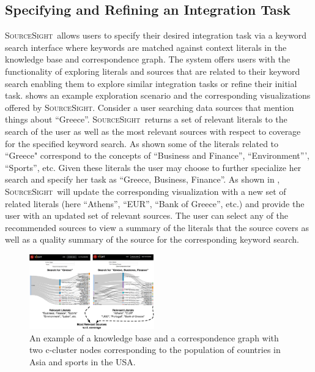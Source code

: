 \documentclass{vldb}
\newcommand\system{\textsc{SourceSight}}
\begin{document}
\subsection{Specifying and Refining an Integration Task}
\label{sec:integtask}
\system~allows users to specify their desired integration task via a keyword search interface where keywords are matched against context literals in the knowledge base and correspondence graph. The system offers users with the functionality of exploring literals and sources that are related to their keyword search enabling them to explore similar integration tasks or refine their initial task.  shows an example exploration scenario and the corresponding visualizations offered by \system. Consider a user searching data sources that mention things about ``Greece''.  \system~returns a set of relevant literals to the search of the user as well as the most relevant sources with respect to coverage for the specified keyword search. As shown some of the literals related to ``Greece" correspond to the concepts of ``Business and Finance'', ``Environment''', ``Sports'', etc. Given these literals the user may choose to further specialize her search and specify her task as ``Greece, Business, Finance''. As shown in , \system~will update the corresponding visualization with a new set of related literals (here ``Athens'', ``EUR'', ``Bank of Greece'', etc.) and provide the user with an updated set of relevant sources. The user can select any of the recommended sources to view a summary of the literals that the source covers as well as a quality summary of the source for the corresponding keyword search.
\begin{figure}
	\begin{center}
	\includegraphics[trim=0 0 0 60, clip,width=0.48\textwidth]{fig/exploreCor}
	\caption{An example of a knowledge base and a correspondence graph with two c-cluster nodes corresponding to the population of countries in Asia and sports in the USA.}
	\label{fig:exploration}
	\end{center}
\end{figure}
\end{document}
